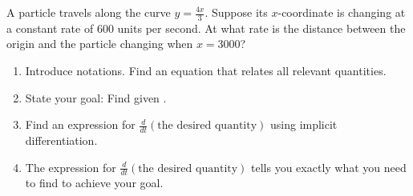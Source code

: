 \documentclass[../main.tex]{subfiles}
\begin{document}
\begin{example} \label{ex:related-rates-plane-variations}
  A particle travels along the curve \(y = \frac{4x}{3}\).  Suppose its \(x\)-coordinate is changing at a constant rate of \(600\) units per second. At what rate is the distance between the origin and the particle changing when \(x = 3000\)?

  \begin{enumerate}[wide, label=(Step~\arabic*).]
    \item Introduce notations. Find an equation that relates all relevant quantities.


    \item State your goal: Find \underline{\hspace{1in}} given \underline{\hspace{3in}}.

    \item Find an expression for \(\frac{d}{dt}(\text{the desired quantity})\) using implicit differentiation.


    \item The expression for \(\frac{d}{dt}\left( \text{the desired quantity} \right)\) tells you exactly what you need to find to achieve your goal.

  \end{enumerate}
\end{example}
\clearpage
\end{document}
